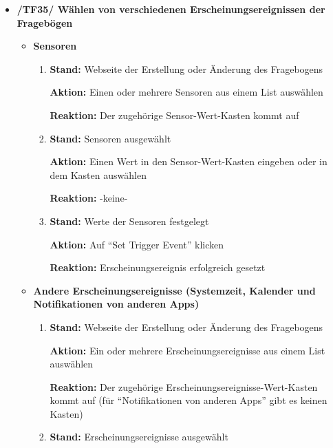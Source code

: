 \documentclass[a4paper]{scrreprt}
\begin{document}
\begin{itemize}
                \item \textbf{/TF35/ Wählen von verschiedenen Erscheinungsereignissen der Fragebögen}
                \begin{itemize}
	                \item \textbf{Sensoren}
		                \begin{enumerate}
		                	\item \par \textbf{Stand: }Webseite der Erstellung oder Änderung des Fragebogens
		                	\par \textbf{Aktion: }Einen oder mehrere Sensoren aus einem List auswählen
		                	\par \textbf{Reaktion: }Der zugehörige Sensor-Wert-Kasten kommt auf
		                	\item \par \textbf{Stand: }Sensoren ausgewählt
		                	\par \textbf{Aktion: }Einen Wert in den Sensor-Wert-Kasten eingeben oder in dem Kasten auswählen
		                	\par \textbf{Reaktion: }-keine-
		                	\item \par \textbf{Stand: }Werte der Sensoren festgelegt
		                	\par \textbf{Aktion: }Auf ``Set Trigger Event'' klicken
		                	\par \textbf{Reaktion: }Erscheinungsereignis erfolgreich gesetzt
		                \end{enumerate}
	                \item \textbf{Andere Erscheinungsereignisse (Systemzeit, Kalender und Notifikationen von anderen Apps)}
		                \begin{enumerate}
		                	\item \par \textbf{Stand: }Webseite der Erstellung oder Änderung des Fragebogens
		                	\par \textbf{Aktion: }Ein oder mehrere Erscheinungsereignisse aus einem List auswählen
		                	\par \textbf{Reaktion: }Der zugehörige Erscheinungsereignisse-Wert-Kasten kommt auf (für ``Notifikationen von anderen Apps'' gibt es keinen Kasten)
		                	\item \par \textbf{Stand: }Erscheinungsereignisse ausgewählt

\end{enumerate}
\end{itemize}
\end{itemize}
\end{document}
